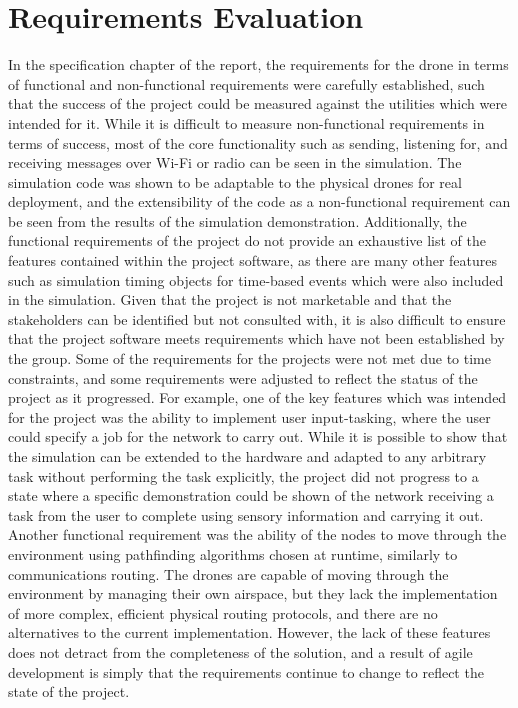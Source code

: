 	\section{Requirements Evaluation}
In the specification chapter of the report, the requirements for the drone in terms of functional and non-functional requirements were carefully established, such that the success of the project could be measured against the utilities which were intended for it.  While it is difficult to measure non-functional requirements in terms of success, most of the core functionality such as sending, listening for, and receiving messages over Wi-Fi or radio can be seen in the simulation. The simulation code was shown to be adaptable to the physical drones for real deployment, and the extensibility of the code as a non-functional requirement can be seen from the results of the simulation demonstration. Additionally, the functional requirements of the project do not provide an exhaustive list of the features contained within the project software, as there are many other features such as simulation timing objects for time-based events which were also included in the simulation. Given that the project is not marketable and that the stakeholders can be identified but not consulted with, it is also difficult to ensure that the project software meets requirements which have not been established by the group. 
Some of the requirements for the projects were not met due to time constraints, and some requirements were adjusted to reflect the status of the project as it progressed. For example, one of the key features which was intended for the project was the ability to implement user input-tasking, where the user could specify a job for the network to carry out. While it is possible to show that the simulation can be extended to the hardware and adapted to any arbitrary task without performing the task explicitly, the project did not progress to a state where a specific demonstration could be shown of the network receiving a task from the user to complete using sensory information and carrying it out. Another functional requirement was the ability of the nodes to move through the environment using pathfinding algorithms chosen at runtime, similarly to communications routing. The drones are capable of moving through the environment by managing their own airspace, but they lack the implementation of more complex, efficient physical routing protocols, and there are no alternatives to the current implementation. However, the lack of these features does not detract from the completeness of the solution, and a result of agile development is simply that the requirements continue to change to reflect the state of the project.
